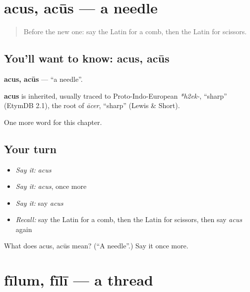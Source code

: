 \section[acus, acūs]{acus, acūs — a needle}

\label{lesson:LA-C140-acus}



\begin{quote}
Before the new one: say the Latin for a comb, then the Latin for scissors.
\end{quote}

\subsection*{You'll want to know: acus, acūs}
\textbf{acus, acūs} — \textquotedblleft{}a needle\textquotedblright{}.

\begin{cousinweb}
\textbf{acus} is inherited, usually traced to Proto-Indo-European \emph{*h2ek-}, \textquotedblleft{}sharp\textquotedblright{} (EtymDB 2.1), the root of \emph{ācer}, \textquotedblleft{}sharp\textquotedblright{} (Lewis \& Short).
\end{cousinweb}

\begin{grammarlens}[title={What you've built}]
One more word for this chapter.
\end{grammarlens}

\subsection*{Your turn}
\begin{itemize}
\raggedright
  \item \emph{Say it:} \emph{acus}
  \item \emph{Say it:} \emph{acus}, once more
  \item \emph{Say it:} say \emph{acus}
  \item \emph{Recall:} say the Latin for a comb, then the Latin for scissors, then say \emph{acus} again
\end{itemize}

\begin{tcolorbox}[breakable,colback=teal!4,colframe=teal!35!black,title={Before you move on}]
What does acus, acūs mean? (\textquotedblleft{}A needle\textquotedblright{}.) Say it once more.
\end{tcolorbox}
\section[fīlum, fīlī]{fīlum, fīlī — a thread}


